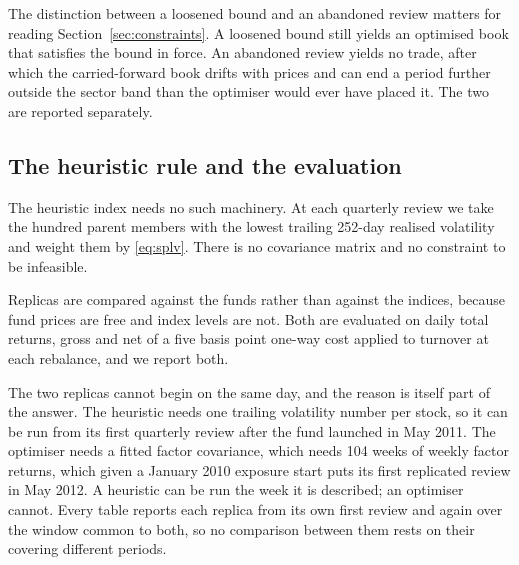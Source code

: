 The distinction between a loosened bound and an abandoned review matters for
reading Section~\ref{sec:constraints}. A loosened bound still yields an
optimised book that satisfies the bound in force. An abandoned review yields no
trade, after which the carried-forward book drifts with prices and can end a
period further outside the sector band than the optimiser would ever have
placed it. The two are reported separately.

\subsection{The heuristic rule and the evaluation}
The heuristic index needs no such machinery. At each quarterly review we take
the hundred parent members with the lowest trailing 252-day realised
volatility and weight them by \eqref{eq:splv}. There is no covariance matrix
and no constraint to be infeasible.

Replicas are compared against the funds rather than against the indices,
because fund prices are free and index levels are not. Both are evaluated on
daily total returns, gross and net of a five basis point one-way cost applied
to turnover at each rebalance, and we report both.

The two replicas cannot begin on the same day, and the reason is itself part of
the answer. The heuristic needs one trailing volatility number per stock, so it
can be run from its first quarterly review after the fund launched in May 2011.
The optimiser needs a fitted factor covariance, which needs 104 weeks of weekly
factor returns, which given a January 2010 exposure start puts its first
replicated review in May 2012. A heuristic can be run the week it is described;
an optimiser cannot. Every table reports each replica from its own first
review and again over the window common to both, so no comparison between them
rests on their covering different periods.
